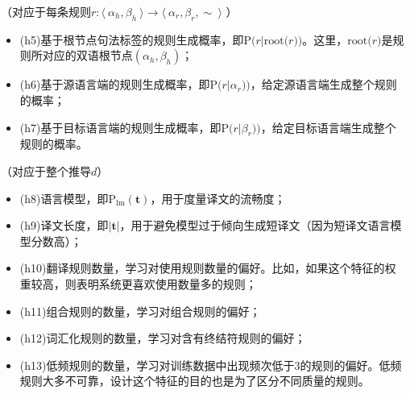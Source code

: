 \vspace{0.5em}
（对应于每条规则$r : \langle\  \alpha_h, \beta_h\ \rangle \to \langle\ \alpha_r, \beta_r, \sim\ \rangle$ ）

\begin{itemize}
\vspace{0.5em}
\item (h5)基于根节点句法标签的规则生成概率，即$\textrm{P(}r|\textrm{root(}r\textrm{))}$。这里，$\textrm{root(}r)$是规则所对应的双语根节点$(\alpha_h,\beta_h)$；
\vspace{0.5em}
\item (h6)基于源语言端的规则生成概率，即$\textrm{P(}r|\alpha_r))$，给定源语言端生成整个规则的概率；
\vspace{0.5em}
\item (h7)基于目标语言端的规则生成概率，即$\textrm{P(}r|\beta_r))$，给定目标语言端生成整个规则的概率。
\end{itemize}

\vspace{0.5em}
（对应于整个推导$d$）

\begin{itemize}
\vspace{0.5em}
\item (h8)语言模型，即$\textrm{P}_{\textrm{lm}}(\mathbf{t})$，用于度量译文的流畅度；
\vspace{0.5em}
\item (h9)译文长度，即$|\mathbf{t}|$，用于避免模型过于倾向生成短译文（因为短译文语言模型分数高）；
\vspace{0.5em}
\item (h10)翻译规则数量，学习对使用规则数量的偏好。比如，如果这个特征的权重较高，则表明系统更喜欢使用数量多的规则；
\vspace{0.5em}
\item (h11)组合规则的数量，学习对组合规则的偏好；
\vspace{0.5em}
\item (h12)词汇化规则的数量，学习对含有终结符规则的偏好；
\vspace{0.5em}
\item (h13)低频规则的数量，学习对训练数据中出现频次低于3的规则的偏好。低频规则大多不可靠，设计这个特征的目的也是为了区分不同质量的规则。
\end{itemize}

\vspace{0.5em}



